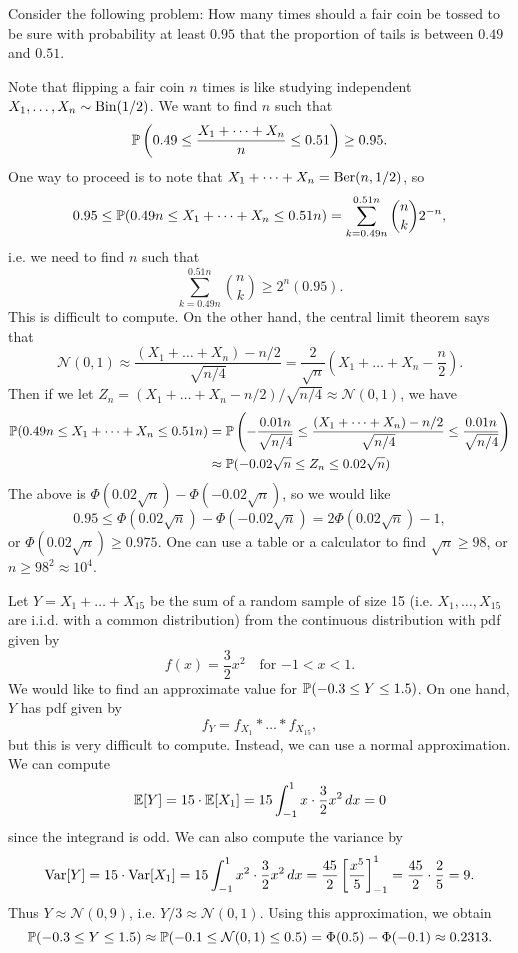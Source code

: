 \begin{example}
  Consider the following problem: How many
  times should a fair coin be tossed to be sure
  with probability at least $0.95$ that the
  proportion of
  tails is between $0.49$ and $0.51$.

  Note that flipping a fair coin $n$ times
  is like studying independent
  $X_1, \dots, X_n \sim \operatorname{Bin}(1 / 2)$. We want to
  find $n$ such that
  \[
    \mathbb{P}\left(0.49 \le \frac{X_1 + \dots + X_n}{n} \le 0.51\right) \ge 0.95.
  \]
  One way to proceed is to note that
  $X_1 + \dots + X_n = \operatorname{Ber}(n, 1 / 2)$, so
  \[
    0.95 \le \mathbb{P}(0.49n \le X_1 + \dots + X_n \le 0.51n)
    = \sum_{k = 0.49n}^{0.51n} \binom{n}{k} 2^{-n},
  \]
  i.e. we need to find $n$ such that
  \[
    \sum_{k = 0.49n}^{0.51n} \binom{n}{k} \ge 2^n(0.95).
  \]
  This is difficult to compute. On the other hand,
  the central limit theorem says that
  \[
    \mathcal{N}(0, 1)
    \approx \frac{(X_1 + \dots + X_n) - n / 2}{\sqrt{n / 4}}
    = \frac{2}{\sqrt{n}} \left(X_1 + \dots + X_n - \frac{n}{2}\right).
  \]
  Then if we let $Z_n = (X_1 + \dots + X_n - n / 2) / \sqrt{n / 4} \approx \mathcal{N}(0, 1)$, we have
  \begin{align*}
    \mathbb{P}(0.49n \le X_1 + \dots + X_n \le 0.51n)
    &= \mathbb{P}\left(-\frac{0.01n}{\sqrt{n / 4}} \le \frac{(X_1 + \dots + X_n) - n / 2}{\sqrt{n / 4}} \le \frac{0.01n}{\sqrt{n / 4}}\right) \\
    &\approx \mathbb{P}(-0.02 \sqrt{n} \le Z_n \le 0.02 \sqrt{n})
  \end{align*}
  The above is $\Phi(0.02 \sqrt{n}) - \Phi(-0.02 \sqrt{n})$, so we would like
  \[
    0.95 \le \Phi(0.02 \sqrt{n}) - \Phi(-0.02 \sqrt{n})
    = 2\Phi(0.02 \sqrt{n}) - 1,
  \]
  or $\Phi(0.02 \sqrt{n}) \ge 0.975$. One can use
  a table or a calculator to find
  $\sqrt{n} \ge 98$, or $n \ge 98^2 \approx 10^4$.
\end{example}

\begin{example}
  Let $Y = X_1 + \dots + X_{15}$ be the sum of a
  random sample of size 15 (i.e. $X_1, \dots, X_{15}$
  are i.i.d. with a common distribution)
  from the continuous distribution with pdf given
  by
  \[
    f(x) = \frac{3}{2} x^2 \quad \text{for $-1 < x < 1$}.
  \]
  We would like to find an approximate
  value for
  $\mathbb{P}(-0.3 \le Y \le 1.5)$. On one hand,
  $Y$ has pdf given by
  \[
    f_Y = f_{X_1} * \dots * f_{X_{15}},
  \]
  but this is very difficult to compute. Instead,
  we can use a normal approximation. We can compute
  \[
    \mathbb{E}[Y] = 15 \cdot \mathbb{E}[X_1]
    = 15 \int_{-1}^1 x \cdot \frac{3}{2} x^2 \, dx
    = 0
  \]
  since the integrand is odd. We can also compute
  the variance by
  \[
    \operatorname{Var}[Y] = 15 \cdot \operatorname{Var}[X_1]
    = 15 \int_{-1}^1 x^2 \cdot \frac{3}{2} x^2 \, dx
    = \frac{45}{2}\left[\frac{x^5}{5}\right]_{-1}^1
    = \frac{45}{2} \cdot \frac{2}{5} = 9.
  \]
  Thus $Y \approx \mathcal{N}(0, 9)$, i.e.
  $Y / 3 \approx \mathcal{N}(0, 1)$. Using this
  approximation, we obtain
  \[
    \mathbb{P}(-0.3 \le Y \le 1.5)
    \approx \mathbb{P}(-0.1 \le \mathcal{N}(0, 1) \le 0.5)
    = \Phi(0.5) - \Phi(-0.1) \approx 0.2313.
  \]
\end{example}

